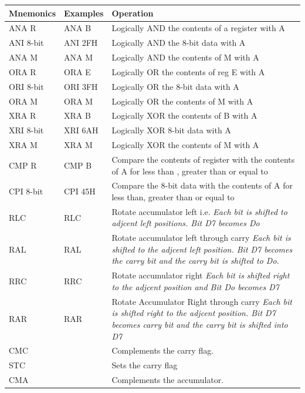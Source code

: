 \documentclass[]{report}
\begin{document}
\begin{tabular}{p{2cm} p{2cm} p{9cm}}
    \hline
    Mnemonics & Examples & Operation \\
    \hline
    ANA R & ANA B & Logically AND the contents of a register with A \\
    ANI 8-bit & ANI 2FH & Logically AND the 8-bit data with A \\
    ANA M & ANA M & Logically AND the contents of M with A \\
    ORA R & ORA E & Logically OR the contents of reg E with A \\
    ORI 8-bit & ORI 3FH & Logically OR the 8-bit data with A \\
    ORA M & ORA M & Logically OR the contents of M with A \\
    XRA R & XRA B & Logically XOR the contents of B with A \\
    XRI 8-bit & XRI 6AH & Logically XOR 8-bit data with A \\
    XRA M & XRA M & Logically XOR the contents of M with A \\
    CMP R & CMP B & Compare the contents of register with the contents of A for less than , greater than or equal to \\
    CPI 8-bit & CPI 45H & Compare the 8-bit data with the contents of A for less than, greater than or equal to \\
    RLC & RLC & Rotate accumulator left i.e. \emph{Each bit is shifted to adjcent left positions. Bit D7 becomes Do} \\
    RAL & RAL & Rotate accumulator left through carry \emph{Each bit is shifted to the adjcent left position. Bit D7 becomes the carry bit and the carry bit is shifted to Do.} \\
    RRC & RRC & Rotate accumulator right \emph{Each bit is shifted right to the adjcent position and Bit Do becomes D7} \\
    RAR & RAR & Rotate Accumulator Right through carry \emph{Each bit is shifted right to the adjcent position. Bit D7 becomes carry bit and the carry bit is shifted into D7} \\
    CMC & & Complements the carry flag. \\
    STC & & Sets the carry flag \\
    CMA & & Complements the accumulator. \\

    \hline
\end{tabular}
\vspace{5mm}
\end{document}
